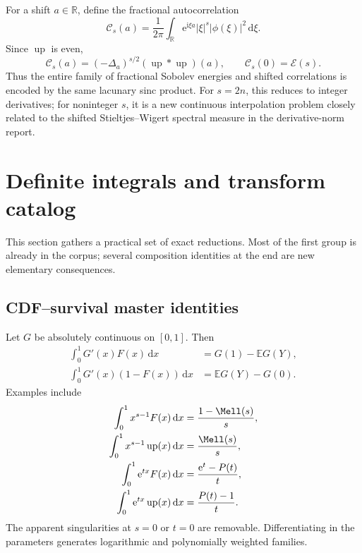 \documentclass[11pt,oneside]{article}
\theoremstyle{definition}
\theoremstyle{remark}
\newcommand{\Up}{\operatorname{up}}
\newcommand{\E}{\mathbb E}
\newcommand{\R}{\mathbb R}
\newcommand{\dd}{\,\mathrm d}
\newcommand{\e}{\mathrm e}
\newcommand{\ii}{\mathrm i}
\newcommand{\1}{\mathbf 1}
\begin{document}
For a shift $a\in\R$, define the fractional autocorrelation
\begin{equation}
 \mathcal C_s(a)
 =\frac1{2\pi}\int_{\R}
  \e^{\ii\xi a}|\xi|^s|\phi(\xi)|^2\dd\xi.
 \label{p9:eq:C-s-a}
\end{equation}
Since $\Up$ is even,
\begin{equation}
 \mathcal C_s(a)
 =(-\Delta_a)^{s/2}(\Up*\Up)(a),
 \qquad
 \mathcal C_s(0)=\mathcal E(s).
 \label{p9:eq:C-fractional-correlation}
\end{equation}
Thus the entire family of fractional Sobolev energies and shifted correlations
is encoded by the same lacunary sinc product.  For $s=2n$, this reduces to
integer derivatives; for noninteger $s$, it is a new continuous interpolation
problem closely related to the shifted Stieltjes--Wigert spectral measure in
the derivative-norm report.

\section{Definite integrals and transform catalog}
\label{p9:sec:definite-catalog}

This section gathers a practical set of exact reductions.  Most of the first
group is already in the corpus; several composition identities at the end are
new elementary consequences.

\subsection{CDF--survival master identities}

Let $G$ be absolutely continuous on $[0,1]$.  Then
\begin{align}
 \int_0^1G'(x)F(x)\dd x
 &=G(1)-\E G(Y),
 \label{p9:eq:CDF-master}\\
 \int_0^1G'(x)(1-F(x))\dd x
 &=\E G(Y)-G(0).
 \label{p9:eq:survival-master}
\end{align}
Examples include
\begin{align}
 \int_0^1x^{s-1}F(x)\dd x
 &=\frac{1-\Mell(s)}s,
 \label{p9:eq:Mellin-F}\\
 \int_0^1x^{s-1}\Up(x)\dd x
 &=\frac{\Mell(s)}s,
 \label{p9:eq:Mellin-half-up}\\
 \int_0^1\e^{tx}F(x)\dd x
 &=\frac{\e^t-P(t)}t,
 \label{p9:eq:Laplace-F}\\
 \int_0^1\e^{tx}\Up(x)\dd x
 &=\frac{P(t)-1}t.
 \label{p9:eq:Laplace-half-up}
\end{align}
The apparent singularities at $s=0$ or $t=0$ are removable.  Differentiating
in the parameters generates logarithmic and polynomially weighted families.
\end{document}

